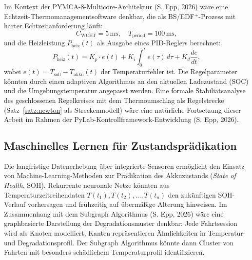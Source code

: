 ﻿\documentclass[a4paper,12pt]{article}
\theoremstyle{definition}
\begin{document}
Im Kontext der PYMCA-8-Multicore-Architektur (S. Epp, 2026) w\"are eine Echtzeit-Thermomanage\-mentsoftware denkbar, die als BS/EDF$^+$-Prozess mit harter Echtzeitanforderung l\"auft:
\[
  C_\mathrm{WCET} = 5\,\mathrm{ms}, \quad T_\mathrm{period} = 100\,\mathrm{ms},
\]
und die Heizleistung $P_\mathrm{heiz}(t)$ als Ausgabe eines PID-Reglers berechnet:
\[
  P_\mathrm{heiz}(t) = K_p \cdot e(t) + K_i \int_0^t e(\tau)\,d\tau + K_d \frac{de}{dt},
\]
wobei $e(t) = T_\mathrm{soll} - T_\mathrm{akku}(t)$ der Temperaturfehler ist. Die Regelparameter k\"onnten durch einen adaptiven Algorithmus an den aktuellen Ladezustand (SOC) und die Umgebungstemperatur angepasst werden. Eine formale Stabili\"atsanalyse des geschlossenen Regelkreises mit dem Thermoumschlag als Regelstrecke (Satz~\ref{satz:newton} als Streckenmodell) w\"are eine nat\"urliche Fortsetzung dieser Arbeit im Rahmen der PyLab-Kontrollframework-Entwick\-lung (S. Epp, 2026).

\subsection{Maschinelles Lernen f\"ur Zustandspr\"adikation}

Die langfristige Datenerhebung \"uber integrierte Sensoren erm\"oglicht den Einsatz von Machine-Learning-Methoden zur Pr\"adikation des Akkuzustands (\emph{State of Health}, SOH). Rekurrente neuronale Netze k\"onnten aus Temperaturzeitreihendaten $T(t_1), T(t_2), \ldots, T(t_n)$ den zuk\"unftigen SOH-Verlauf vorhersagen und fr\"uhzeitig auf \"uberm\"a\ss{}ige Alterung hinweisen. Im Zusammenhang mit dem Subgraph Algorithmus (S. Epp, 2026) w\"are eine graphbasierte Darstellung der Degradationsmuster denkbar: Jede Fahrtsession wird als Knoten modelliert, Kanten repr\"asentieren \"Ahnlichkeiten in Temperatur- und Degradationsprofil. Der Subgraph Algorithmus k\"onnte dann Cluster von Fahrten mit besonders sch\"adlichem Temperaturprofil identifizieren.
\end{document}
